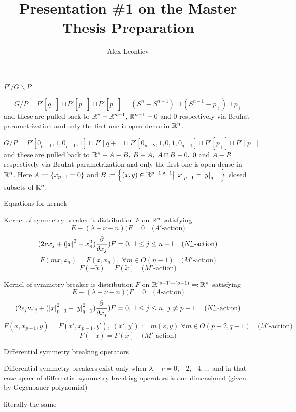 \documentclass[8pt]{beamer}
\title{Presentation \#1 on the Master Thesis Preparation}
\subtitle{Alex Leontiev}
\theoremstyle{mystyle}
\begin{document}
\begin{frame}\titlepage\end{frame}
\begin{frame}{$P'/G\backslash P$}
	\begin{theorem}\[G/P=P'[q_+]\sqcup P'[p_+]\sqcup P'[p_+]=
		(S^n-S^{n-1})\sqcup (S^{n-1}-{p_+})\sqcup p_+\]
		and these are pulled back to $\mathbb{R}^n-\mathbb{R}^{n-1}$, $\mathbb{R}^{n-1}-0$ and $0$ respectively via Bruhat parametrization and
		only the first one is open dense in $\mathbb{R}^n$.
\end{theorem}
\begin{theorem}[$O(p,q),\;n:=(p-1)+(q-1)$]
	\[G/P=P'[0_{p-1},1,0_{q-1},1]\sqcup P'[q+]\sqcup P'[0_{p-2},1,0,1,0_{q-1}]\sqcup P'[p_+]\sqcup P'[p_-]\]
	and these are pulled back to $\mathbb{R}^n-A-B,\;B-A,\;A\cap B-{0},\;{0}$ and $A-B$ respectively via Bruhat parametrization and
		only the first one is open dense in $\mathbb{R}^n$.
Here $A:=\left\{x_{p-1}=0\right\}$ and $B:=\left\{(x,y)\in\mathbb{R}^{p-1,q-1}\big| \left|x\right|_{p-1}=\left|y\right|_{q-1}\right\}$ closed subsets of $\mathbb{R}^n$.
\end{theorem}
\end{frame}
\begin{frame}{Equations for kernels}
\begin{theorem}Kernel of symmetry breaker is distribution $F$ on $\mathbb{R}^n$ satisfying
	\[E-(\lambda-\nu-n))F=0\quad\mbox{($A'$-action)}\]
\[(2\nu x_j+(\left|x\right|^2+x_n^2)\frac{\partial}{\partial x_j})F=0,\;1\leq j\leq n-1\quad\mbox{($N_+'$-action)}\]
\[F(mx,x_n)=F(x,x_n),\;\forall m\in O(n-1)\quad\mbox{($M'$-action)}\]
\[F(-\tilde{x})=F(\tilde{x})\quad\mbox{($M'$-action)}\]
\end{theorem}
\begin{theorem}[O(p,q)]Kernel of symmetry breaker is distribution $F$ on $\mathbb{R}^{(p-1)+(q-1)}=:\mathbb{R}^n$ satisfying
\[E-(\lambda-\nu-n))F=0\quad\mbox{($A$-action)}\]
\[(2\epsilon_j\nu x_j+(\left|x\right|_{p-1}^2-\left|y\right|_{q-1}^2)\frac{\partial}{\partial x_j})F=0,\;1\leq j\leq n,\;j\neq p-1\quad\mbox{
($N'_+$-action)}\]
\[F(x,x_{p-1},y)=F(x',x_{p-1},y'),\;(x',y'):=m(x,y)\;\forall m\in O(p-2,q-1)\quad\mbox{($M'$-action)}\]
\[F(-\tilde{x})=F(\tilde{x})\quad\mbox{($M'$-action)}\]
\end{theorem}
\end{frame}
\begin{frame}{Differential symmetry breaking operators}
\begin{theorem}
	Differential symmetry breakers exist only when $\lambda-\nu=0,-2,-4,\hdots$ and in that case space of
	differential symmetry breaking operators is one-dimensional (given by Gegenbauer polynomial)
\end{theorem}
\begin{theorem}[$O(p,q),\;n:=(p-1)+(q-1)$]
	literally the same
\end{theorem}
\end{frame}
\end{document}
